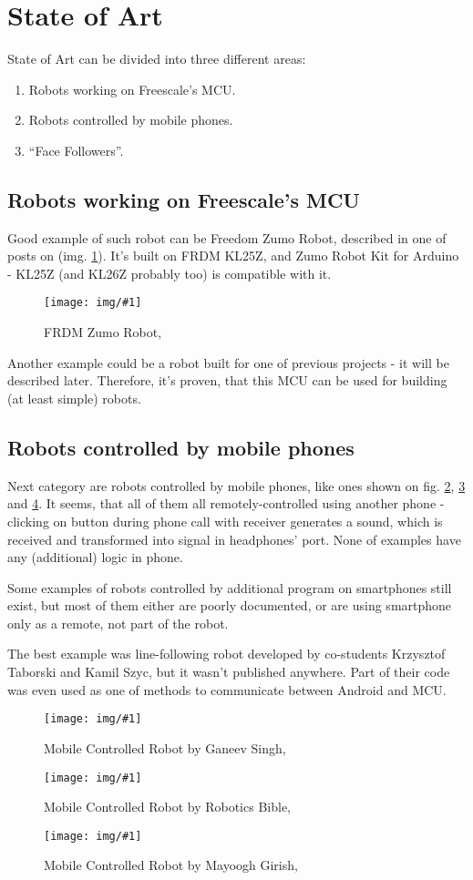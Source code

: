 \documentclass[openany]{mgr} %
\newcommand{\includeimage}[2]{
	\begin{figure}
		\centering
		\texttt{[image: img/\#1]}
		\caption{#2}
		\label{img:#1}
	\end{figure}
}
\begin{document}
\section{State of Art}
State of Art can be divided into three different areas:
\begin{enumerate}
  \item Robots working on Freescale's MCU.
  \item Robots controlled by mobile phones.
  \item ``Face Followers''.
\end{enumerate}

\subsection{Robots working on Freescale's MCU}
Good example of such robot can be Freedom Zumo Robot, described in one of posts
on \cite{mcu_on_eclipse} (img. \ref{img:frd_zumo}). It's built on FRDM KL25Z,
and Zumo Robot Kit for Arduino - KL25Z (and KL26Z probably too) is compatible with
it.
\includeimage{frd_zumo}{FRDM Zumo Robot, \cite{mcu_on_eclipse}}

Another example could be a robot built for one of previous projects - it will be
described later. Therefore, it's proven, that this MCU can be used for building
(at least simple) robots.

\subsection{Robots controlled by mobile phones}
Next category are robots controlled by mobile phones, like ones shown on fig.
\ref{img:SoA1}, \ref{img:SoA2} and \ref{img:SoA3}. It seems, that all of them
all remotely-controlled using another phone - clicking on button during phone
call with receiver generates a sound, which is received and transformed into
signal in headphones' port. None of examples have any (additional) logic in
phone. 

Some examples of robots controlled by additional program on smartphones
still exist, but most of them either are poorly documented, or are using
smartphone only as a remote, not part of the robot. 

The best example was line-following robot developed by co-students Krzysztof
Taborski and Kamil Szyc, but it wasn't published anywhere. Part of their code
was even used as one of methods to communicate between Android and MCU.

\includeimage{SoA1}{Mobile Controlled Robot by Ganeev Singh, \cite{SoA1}}
\includeimage{SoA2}{Mobile Controlled Robot by Robotics Bible, \cite{SoA2}}
\includeimage{SoA3}{Mobile Controlled Robot by Mayoogh Girish, \cite{SoA3}}
\end{document}
